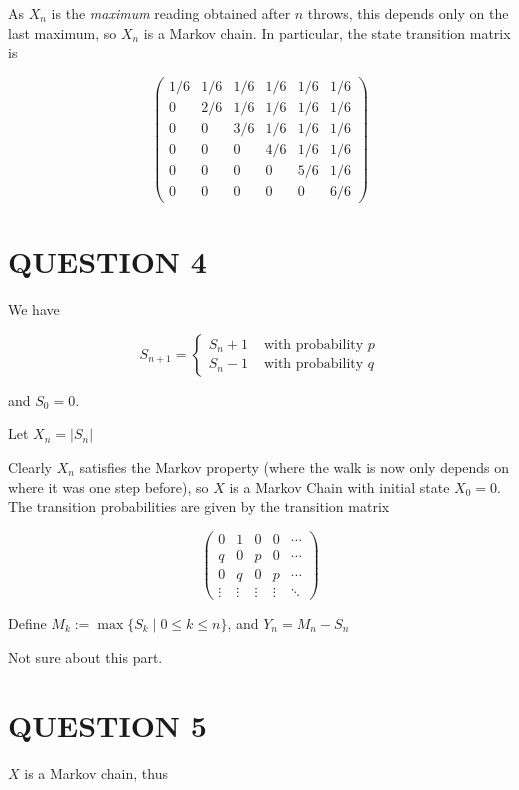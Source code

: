 \documentclass[a4paper]{article}
\begin{document}
As $ X_{n} $ is the \emph{maximum} reading obtained after $ n $ throws, this depends only on the last maximum, so $ X_{n} $ is a Markov chain. In particular, the state transition matrix is


\[ \begin{pmatrix}
1/6 & 1/6 & 1/6 & 1/6 & 1/6 & 1/6  \\
0 & 2/6 & 1/6 & 1/6 & 1/6 & 1/6  \\
0 & 0 & 3/6 & 1/6 & 1/6 & 1/6  \\
0 & 0 & 0 & 4/6 & 1/6 & 1/6 \\
0 & 0 & 0 & 0 & 5/6 & 1/6  \\
0 & 0 & 0 & 0 & 0 & 6/6 
\end{pmatrix} \]


\section{QUESTION 4}

We have

\[ S_{n+1} = \begin{cases} S_{n} + 1  & \text{ with probability } p  \\ S_{n} - 1& \text{ with probability } q \end{cases} \]

and $ S_{0} = 0 $.

Let $ X_{n} = | S_{n} | $

Clearly $ X_{n} $ satisfies the Markov property (where the walk is now only depends on where it was one step before), so $ X $ is a Markov Chain with initial state $ X_{0} = 0 $. The transition probabilities are given by the transition matrix

\[ \begin{pmatrix}
0 & 1 & 0 & 0 & \cdots \\
q & 0 & p & 0 & \cdots \\
0 & q & 0 & p & \cdots \\
\vdots & \vdots & \vdots & \vdots & \ddots
\end{pmatrix} \]

Define $ M_{k} := \max \{ S_{k} \; | \; 0 \leq k \leq n \} $, and $ Y_{n} = M_{n} - S_{n} $

Not sure about this part.

\section{QUESTION 5}

$ X $ is a Markov chain, thus
\end{document}
